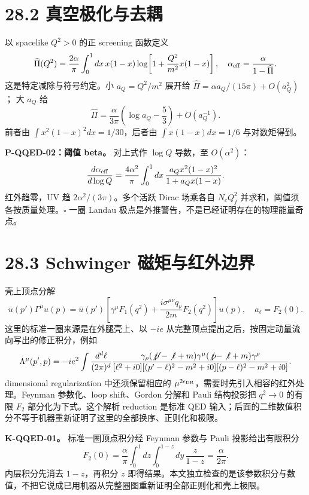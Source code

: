 \documentclass[
  11pt,
  oneside]{book}
\begin{document}
\section{28.2 真空极化与去耦}

以 spacelike \(Q^2>0\) 的正 screening 函数定义 \[
\widehat\Pi(Q^2)=\frac{2\alpha}{\pi}\int_0^1dx\,x(1-x)
\log\!\left[1+\frac{Q^2}{m^2}x(1-x)\right],\quad
\alpha_{\rm eff}=\frac{\alpha}{1-\widehat\Pi}.
\] 这是特定减除与符号约定。小 \(a_Q=Q^2/m^2\) 展开给
\(\widehat\Pi=\alpha a_Q/(15\pi)+O(a_Q^2)\)； 大 \(a_Q\) 给 \[
\widehat\Pi=\frac{\alpha}{3\pi}\left(\log a_Q-\frac53\right)+O(a_Q^{-1}).
\] 前者由 \(\int x^2(1-x)^2dx=1/30\)，后者由 \(\int x(1-x)dx=1/6\)
与对数矩得到。

\protect\hypertarget{p-qqed-02}{}{}

\textbf{P-QQED-02：阈值 beta。} 对上式作 \(\log Q\) 导数，至
\(O(\alpha^2)\)： \[
\frac{d\alpha_{\rm eff}}{d\log Q}
=\frac{4\alpha^2}{\pi}\int_0^1dx\,
\frac{a_Qx^2(1-x)^2}{1+a_Qx(1-x)}.
\] 红外趋零，UV 趋 \(2\alpha^2/(3\pi)\)。多个活跃 Dirac 场乘各自
\(N_cQ_f^2\) 并求和，阈值须各按质量处理。\(\square\) 一圈 Landau
极点是外推警告，不是已经证明存在的物理能量奇点。

\section{28.3 Schwinger 磁矩与红外边界}

壳上顶点分解 \[
\bar u(p')\Gamma^\mu u(p)=\bar u(p')
\left[\gamma^\mu F_1(q^2)
+\frac{i\sigma^{\mu\nu}q_\nu}{2m}F_2(q^2)\right]u(p),
\quad a_\ell=F_2(0).
\] 这里的标准一圈来源是在外腿壳上、以 \(-ie\)
从完整顶点提出之后，按固定动量流向写出的修正积分，例如 \[
\Lambda^\mu(p',p)=-ie^2\int\frac{d^d\ell}{(2\pi)^d}
\frac{\gamma_\rho(\not p'-\not\ell+m)\gamma^\mu
(\not p-\not\ell+m)\gamma^\rho}
{[\ell^2+i0][(p'-\ell)^2-m^2+i0][(p-\ell)^2-m^2+i0]}.
\] dimensional regularization 中还须保留相应的
\(\mu^{2\epsilon_{\rm DR}}\)，需要时先引入相容的红外处理。Feynman
参数化、loop shift、Gordon 分解和 Pauli 结构投影把 \(q^2\to0\) 的有限
\(F_2\) 部分化为下式。这个解析 reduction 是标准 QED
输入；后面的二维数值积分不等于机器重新证明了这里的全部换序、正则化和极限。

\textbf{K-QQED-01。} 标准一圈顶点积分经 Feynman 参数与 Pauli
投影给出有限积分 \[
F_2(0)=\frac{\alpha}{\pi}
\int_0^1dz\int_0^{1-z}dy\,\frac{z}{1-z}
=\frac{\alpha}{2\pi}.
\] 内层积分先消去 \(1-z\)，再积分 \(z\)
即得结果。本文独立检查的是该参数积分与数值，不把它说成已用机器从完整圈图重新证明全部正则化和壳上极限。
\end{document}
